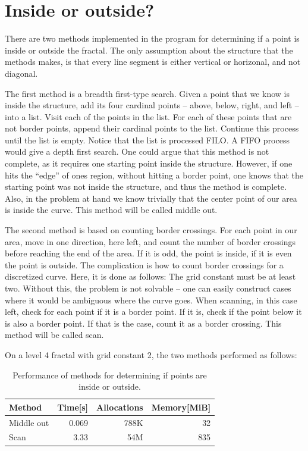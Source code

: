 \documentclass[a4paper, 12pt]{article}
\begin{document}
\section{Inside or outside?}
There are two methods implemented in the program for determining if a point is inside or outside the fractal.
The only assumption about the structure that the methods makes, is that every line segment is either vertical or horizonal, and not diagonal.

The first method is a breadth first-type search.
Given a point that we know is inside the structure, add its four cardinal points -- above, below, right, and left -- into a list.
Visit each of the points in the list.
For each of these points that are not border points, append their cardinal points to the list.
Continue this process until the list is empty.
Notice that the list is processed FILO.
A FIFO process would give a depth first search.
One could argue that this method is not complete, as it requires one starting point inside the structure.
However, if one hits the ``edge'' of ones region, without hitting a border point, one knows that the starting point was not inside the structure, and thus the method is complete.
Also, in the problem at hand we know trivially that the center point of our area is inside the curve.
This method will be called middle out.

The second method is based on counting border crossings.
For each point in our area, move in one direction, here left, and count the number of border crossings before reaching the end of the area.
If it is odd, the point is inside, if it is even the point is outside.
The complication is how to count border crossings for a discretized curve.
Here, it is done as follows:
The grid constant must be at least two.
Without this, the problem is not solvable -- one can easily construct cases where it would be ambiguous where the curve goes.
When scanning, in this case left, check for each point if it is a border point.
If it is, check if the point below it is also a border point.
If that is the case, count it as a border crossing.
This method will be called scan.

On a level 4 fractal with grid constant 2, the two methods performed as follows:
\begin{table}
  \centering
\begin{tabular}{lrrr}
  Method& Time[s]& Allocations& Memory[MiB]\\
  \hline
  Middle out& 0.069& 788K& 32\\
  Scan& 3.33& 54M& 835
\end{tabular}
\caption{Performance of methods for determining if points are inside or outside.}
\end{table}
\end{document}
